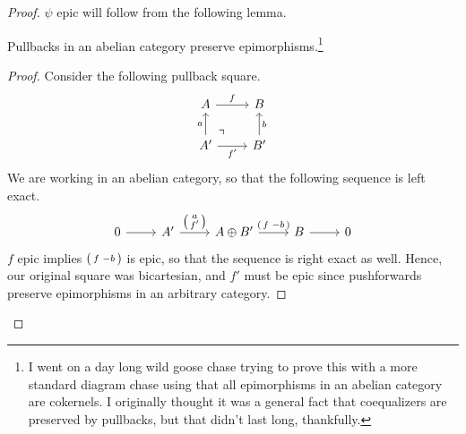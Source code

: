 \documentclass[12pt]{amsart}
\begin{document}
\begin{proof}
  $\psi$ epic will follow from the following lemma.

  \begin{lemma}
    Pullbacks in an abelian category preserve epimorphisms.\footnote{I went on a day long wild goose chase trying to prove this with a more standard diagram chase using that all epimorphisms in an abelian category are cokernels. I originally thought it was a general fact that coequalizers are preserved by pullbacks, but that didn't last long, thankfully.}
  \end{lemma}

  \begin{proof}
    Consider the following pullback square.
    \[
      \begin{tikzcd}
        A\ar[r,"f"] & B\\
        A'\ar[ur,phantom,very near start, "\urcorner"]\ar[u,"a"]\ar[r,"f'"']&B'\ar[u,"b"']
      \end{tikzcd}
    \] 
    We are working in an abelian category, so that the following sequence is left exact.
    \[
      \begin{tikzcd}[ampersand replacement = \&]
        0\ar[r]\&A'\ar[r,"\begin{psmallmatrix}a\\f'\end{psmallmatrix}"]
        \&A\oplus B'\ar[r,"{\begin{psmallmatrix}f & -b\end{psmallmatrix}}"] \&B\ar[r]\&0
      \end{tikzcd}
    \] 
    $f$ epic implies $\begin{psmallmatrix}f&-b\end{psmallmatrix}$ is epic, so that the sequence is right exact as well.
    Hence, our original square was bicartesian, and $f'$ must be epic since pushforwards preserve epimorphisms in an arbitrary category.
  \end{proof}



\end{proof}
\end{document}
